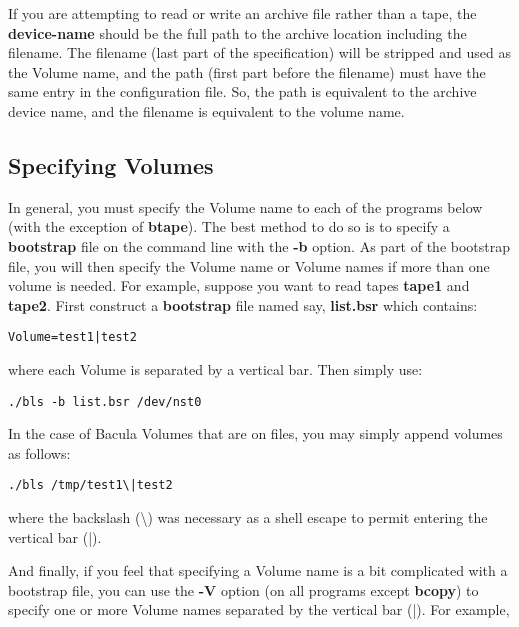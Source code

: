 If you are attempting to read or write an archive file rather than a tape, the
{\bf device-name} should be the full path to the archive location including
the filename. The filename (last part of the specification) will be stripped
and used as the Volume name, and the path (first part before the filename)
must have the same entry in the configuration file. So, the path is equivalent
to the archive device name, and the filename is equivalent to the volume name.


\subsection*{Specifying Volumes}

In general, you must specify the Volume name to each of the programs below
(with the exception of {\bf btape}). The best method to do so is to specify a
{\bf bootstrap} file on the command line with the {\bf -b} option. As part of
the bootstrap file, you will then specify the Volume name or Volume names if
more than one volume is needed. For example, suppose you want to read tapes
{\bf tape1} and {\bf tape2}. First construct a {\bf bootstrap} file named say,
{\bf list.bsr} which contains: 

\footnotesize
\begin{verbatim}
Volume=test1|test2
\end{verbatim}
\normalsize

where each Volume is separated by a vertical bar. Then simply use: 

\footnotesize
\begin{verbatim}
./bls -b list.bsr /dev/nst0
\end{verbatim}
\normalsize

In the case of Bacula Volumes that are on files, you may simply append volumes
as follows: 

\footnotesize
\begin{verbatim}
./bls /tmp/test1\|test2
\end{verbatim}
\normalsize

where the backslash (\textbackslash{}) was necessary as a shell escape to
permit entering the vertical bar (|). 

And finally, if you feel that specifying a Volume name is a bit complicated
with a bootstrap file, you can use the {\bf -V} option (on all programs except
{\bf bcopy}) to specify one or more Volume names separated by the vertical bar
(|). For example, 

